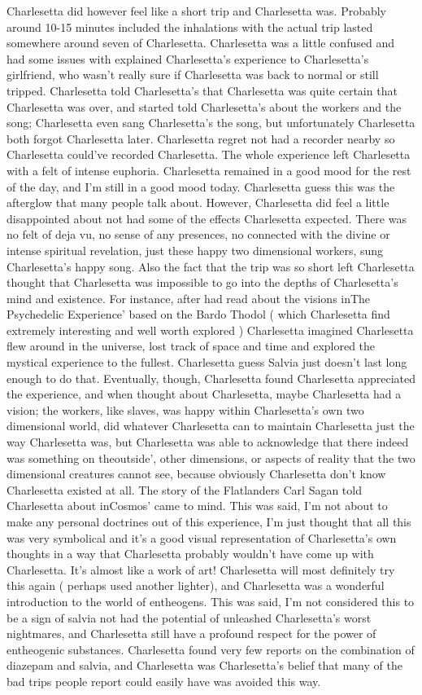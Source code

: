 \documentclass[12pt]{book}
\begin{document}
Charlesetta did however feel like a short trip and Charlesetta was. Probably around 10-15 minutes included the inhalations with the actual trip lasted somewhere around seven of Charlesetta. Charlesetta was a little confused and had some issues with explained Charlesetta's experience to Charlesetta's girlfriend, who wasn't really sure if Charlesetta was back to normal or still tripped. Charlesetta told Charlesetta's that Charlesetta was quite certain that Charlesetta was over, and started told Charlesetta's about the workers and the song; Charlesetta even sang Charlesetta's the song, but unfortunately Charlesetta both forgot Charlesetta later. Charlesetta regret not had a recorder nearby so Charlesetta could've recorded Charlesetta. The whole experience left Charlesetta with a felt of intense euphoria. Charlesetta remained in a good mood for the rest of the day, and I'm still in a good mood today. Charlesetta guess this was the afterglow that many people talk about. However, Charlesetta did feel a little disappointed about not had some of the effects Charlesetta expected. There was no felt of deja vu, no sense of any presences, no connected with the divine or intense spiritual revelation, just these happy two dimensional workers, sung Charlesetta's happy song. Also the fact that the trip was so short left Charlesetta thought that Charlesetta was impossible to go into the depths of Charlesetta's mind and existence. For instance, after had read about the visions inThe Psychedelic Experience' based on the Bardo Thodol ( which Charlesetta find extremely interesting and well worth explored ) Charlesetta imagined Charlesetta flew around in the universe, lost track of space and time and explored the mystical experience to the fullest. Charlesetta guess Salvia just doesn't last long enough to do that. Eventually, though, Charlesetta found Charlesetta appreciated the experience, and when thought about Charlesetta, maybe Charlesetta had a vision; the workers, like slaves, was happy within Charlesetta's own two dimensional world, did whatever Charlesetta can to maintain Charlesetta just the way Charlesetta was, but Charlesetta was able to acknowledge that there indeed was something on theoutside', other dimensions, or aspects of reality that the two dimensional creatures cannot see, because obviously Charlesetta don't know Charlesetta existed at all. The story of the Flatlanders Carl Sagan told Charlesetta about inCosmos' came to mind. This was said, I'm not about to make any personal doctrines out of this experience, I'm just thought that all this was very symbolical and it's a good visual representation of Charlesetta's own thoughts in a way that Charlesetta probably wouldn't have come up with Charlesetta. It's almost like a work of art! Charlesetta will most definitely try this again ( perhaps used another lighter), and Charlesetta was a wonderful introduction to the world of entheogens. This was said, I'm not considered this to be a sign of salvia not had the potential of unleashed Charlesetta's worst nightmares, and Charlesetta still have a profound respect for the power of entheogenic substances. Charlesetta found very few reports on the combination of diazepam and salvia, and Charlesetta was Charlesetta's belief that many of the bad trips people report could easily have was avoided this way.
\end{document}
